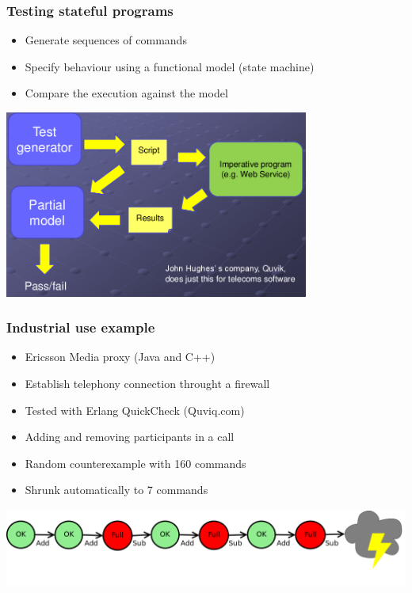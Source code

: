 \documentclass{beamer}
\begin{document}
\begin{frame}
  \frametitle{Testing stateful programs}

\begin{itemize}
\item Generate sequences of commands
\item Specify behaviour using a functional model (state machine)
\item Compare the execution against the model
\end{itemize}

\begin{center}
\includegraphics[width=0.75\textwidth]{images/imperative.png}
\end{center}
\end{frame}



\begin{frame}
  \frametitle{Industrial use example}

\begin{itemize}
\item Ericsson Media proxy (Java and C++)
\item Establish telephony connection throught a firewall
\item Tested with Erlang QuickCheck (Quviq.com)
\item Adding and removing participants in a call
\item Random counterexample with 160 commands
\item Shrunk automatically to 7 commands
\end{itemize}

\begin{center}
\includegraphics[width=\textwidth]{images/media1}
\end{center}
\end{frame}
\end{document}
